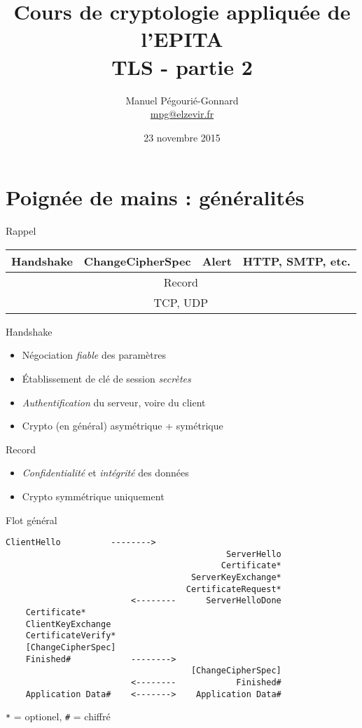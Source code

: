 \documentclass{mpg-ep-slides}
\author[MPG]{Manuel Pégourié-Gonnard\\
  \href{mailto:mpg@elzevir.fr}{{mpg@elzevir.fr}}
}
\institute[ARM]{\normalsize ARM France - IoT - mbed TLS}
\title{Cours de cryptologie appliquée de l'EPITA \\ TLS - partie 2}
\date{23 novembre 2015}
\begin{document}
\lictitle

\section[Handshake]{Poignée de mains : généralités}
\tocsect

\begin{frame}{Rappel}
  \begin{center}
    \renewcommand\arraystretch{1.5}
    \begin{tabular}{|c|c|c|c|}
      \hline
      Handshake & ChangeCipherSpec & Alert &
      \multicolumn{1}{|c|}{ \color{gray} HTTP, SMTP, etc. } \\ \hline
      \multicolumn{4}{|c|}{Record} \\ \hline
      \multicolumn{4}{|c|}{\color{gray} TCP, UDP} \\ \hline
    \end{tabular}
  \end{center}

  \begin{block}{Handshake}
    \begin{itemize}
      \item Négociation \emph{fiable} des paramètres
      \item Établissement de clé de session \emph{secrètes}
      \item \emph{Authentification} du serveur, voire du client
      \item Crypto (en général) asymétrique + symétrique
    \end{itemize}
  \end{block}
  \begin{block}{Record}
    \begin{itemize}
      \item \emph{Confidentialité} et \emph{intégrité} des données
      \item Crypto symmétrique uniquement
    \end{itemize}
  \end{block}
\end{frame}

\begin{frame}[containsverbatim]{Flot général}
  \begin{Verbatim}[gobble=4, fontsize=\small]
    ClientHello          -------->
                                            ServerHello
                                           Certificate*
                                     ServerKeyExchange*
                                    CertificateRequest*
                         <--------      ServerHelloDone
    Certificate*
    ClientKeyExchange
    CertificateVerify*
    [ChangeCipherSpec]
    Finished#            -------->
                                     [ChangeCipherSpec]
                         <--------            Finished#
    Application Data#    <------->    Application Data#
  \end{Verbatim}
  \texttt{*} = optionel, \texttt{\#} = chiffré
\end{frame}
\end{document}

